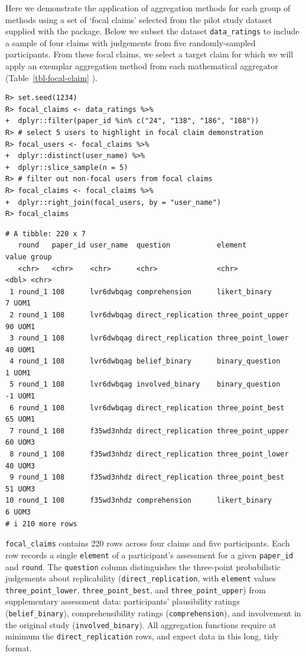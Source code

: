 \documentclass[article]{jss}
\begin{document}
Here we demonstrate the application of aggregation methods for each
group of methods using a set of `focal claims' selected from the pilot
study dataset supplied with the  package. Below we subset
the dataset \texttt{data\_ratings} to include a sample of four claims
with judgements from five randomly-sampled participants. From these
focal claims, we select a target claim for which we will apply an
exemplar aggregation method from each mathematical aggregator
(Table~\ref{tbl-focal-claim} ).

\begin{verbatim}
R> set.seed(1234)
R> focal_claims <- data_ratings %>%
+  dplyr::filter(paper_id %in% c("24", "138", "186", "108"))
R> # select 5 users to highlight in focal claim demonstration
R> focal_users <- focal_claims %>%
+  dplyr::distinct(user_name) %>%
+  dplyr::slice_sample(n = 5)
R> # filter out non-focal users from focal claims
R> focal_claims <- focal_claims %>%
+  dplyr::right_join(focal_users, by = "user_name")
R> focal_claims
\end{verbatim}

\begin{verbatim}
# A tibble: 220 x 7
   round   paper_id user_name  question           element           value group
   <chr>   <chr>    <chr>      <chr>              <chr>             <dbl> <chr>
 1 round_1 108      lvr6dwbqag comprehension      likert_binary         7 UOM1 
 2 round_1 108      lvr6dwbqag direct_replication three_point_upper    90 UOM1 
 3 round_1 108      lvr6dwbqag direct_replication three_point_lower    40 UOM1 
 4 round_1 108      lvr6dwbqag belief_binary      binary_question       1 UOM1 
 5 round_1 108      lvr6dwbqag involved_binary    binary_question      -1 UOM1 
 6 round_1 108      lvr6dwbqag direct_replication three_point_best     65 UOM1 
 7 round_1 108      f35wd3nhdz direct_replication three_point_upper    60 UOM3 
 8 round_1 108      f35wd3nhdz direct_replication three_point_lower    40 UOM3 
 9 round_1 108      f35wd3nhdz direct_replication three_point_best     51 UOM3 
10 round_1 108      f35wd3nhdz comprehension      likert_binary         6 UOM3 
# i 210 more rows
\end{verbatim}

\texttt{focal\_claims} contains 220 rows across four claims and five
participants. Each row records a single \texttt{element} of a
participant's assessment for a given \texttt{paper\_id} and
\texttt{round}. The \texttt{question} column distinguishes the
three-point probabilistic judgements about replicability
(\texttt{direct\_replication}, with \texttt{element} values
\texttt{three\_point\_lower}, \texttt{three\_point\_best}, and
\texttt{three\_point\_upper}) from supplementary assessment data:
participants' plausibility ratings (\texttt{belief\_binary}),
comprehensibility ratings (\texttt{comprehension}), and involvement in
the original study (\texttt{involved\_binary}). All aggregation
functions require at minimum the \texttt{direct\_replication} rows, and
expect data in this long, tidy format.
\end{document}
